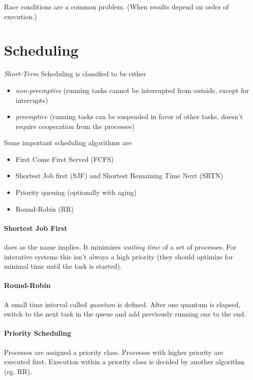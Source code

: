 \documentclass{article}
\begin{document}
\begin{multicols}{1}
Race conditions are a common problem. (When results depend on order of execution.)

\section*{Scheduling}

\emph{Short-Term} Scheduling is classified to be either
\begin{itemize}
    \item \emph{non-preemptive} (running tasks cannot be interrupted from outside, except for interrupts)
    \item \emph{preemptive} (running tasks can be suspended in favor of other tasks, doesn't require cooperation from the processes)
\end{itemize}

Some important scheduling algorithms are
\begin{itemize}
    \item First Come First Served (FCFS)
    \item Shortest Job first (SJF) and Shortest Remaining Time Next (SRTN)
    \item Priority queuing (optionally with aging)
    \item Round-Robin (RR)
\end{itemize}

\paragraph{Shortest Job First} does as the name implies. It minimizes \emph{waiting time} of a set of processes. For interative systems this isn't always a high priority (they should optimize for minimal time until the task is started). 

\paragraph{Round-Robin} A small time interval called \emph{quantum} is defined. After one quantum is elapsed, switch to the next task in the queue and add previously running one to the end.

\paragraph{Priority Scheduling} Processes are assigned a priority class. Processes with higher priority are executed first. Execution within a priority class is decided by another algorithm (eg. RR).


\end{multicols}
\end{document}
